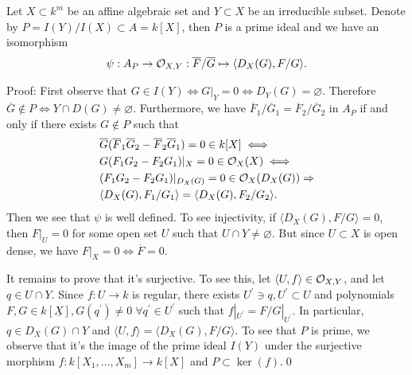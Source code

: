 \begin{dang}
    \begin{proposition}\label{proposition: isomorphism from the localization O_X,Y}
        Let $X\subset k^m$ be an affine algebraic set and $Y\subset X$ be an irreducible subset. 
        Denote by $P=I(Y)/ I(X)\subset A = k[X]$, then $P$ is a prime ideal and we have an isomorphism
        \begin{equation}
          \psi:  A_P \rightarrow \mathcal{O}_{X,Y}: \overline{F}/\overline{G}\mapsto \langle D_X(G), F/G\rangle.
        \end{equation}
    \end{proposition}
\end{dang}
Proof: First observe that $G\in I(Y)\iff G|_Y = 0\iff D_Y(G)=\varnothing$. Therefore 
$\overline{G}\notin P\iff Y\cap D(G)\neq\varnothing$.
Furthermore, we have $\overline{F}_1/\overline{G}_1 = \overline{F}_2/\overline{G}_2$ in $A_P$ 
if and only if there exists $G\notin P$ such that 
\begin{equation}
    \begin{split}
        &\overline{G}(\overline{F}_1\overline{G}_2 - \overline{F}_2\overline{G}_1) = 0 \in k[X]\iff\\
        &G(F_1G_2 - F_2G_1) |_X = 0 \in \mathcal{O}_X(X)\iff\\
        &(F_1G_2 - F_2G_1)|_{D_X(G)} = 0\in\mathcal{O}_X(D_X(G))\Rightarrow\\
        &\langle D_X(G), F_1/G_1\rangle = \langle D_X(G), F_2/G_2\rangle.
    \end{split}
\end{equation}
Then we see that $\psi$ is well defined. To see injectivity, if $\langle D_X(G), F/G\rangle=0$, then 
$F|_{U}=0$ for some open set $U$ such that $U\cap Y\neq \varnothing$. But since $U\subset X$ is open dense, we have 
$F|_X=0\iff \overline{F}=0$.\par

It remains to prove that it's surjective. To see this, let 
$\langle U, f\rangle \in\mathcal{O}_{X,Y}$, and let $q\in U\cap Y$. Since $f:U\to k$ is regular, there exists 
$U^\prime\ni q, U^\prime\subset U$ and polynomials $F,G\in k[\underline{X}], G(q^\prime)\neq0\;\forall q^\prime\in U^\prime$ 
such that $f|_{U^\prime}=F/G |_{U^\prime}$. In particular, $q\in D_X(G)\cap Y$ and 
$\langle U,f\rangle = \langle D_X(G), F/G\rangle$.
To see that $P$ is prime, we observe that it's the image of the prime ideal $I(Y)$ under the surjective morphism 
$f:k[X_1,\dots,X_m]\to k[X]$ and $P\subset\ker(f)$.\qed

